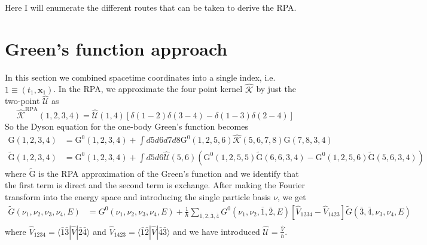 Here I will enumerate the different routes that can be taken to derive the RPA.
\section{Green's function approach}
In this section we combined spacetime coordinates into a single index, i.e. $1 \equiv (t_1, \mathbf{x}_1)$.
In the RPA, we approximate the four point kernel $\hat{\mathcal{K}}$ by just the two-point $\hat{\mathcal{U}}$ as
\begin{equation}
\hat{\mathcal{K}}^{\mathrm{RPA}}\left( 1, 2, 3, 4\right)=\hat{\mathcal{U}}\left(1, 4\right)\left[\delta\left(1-2\right) \delta\left(3-4\right)-\delta\left(1-3\right) \delta\left(2-4\right)\right]
\end{equation}
So the Dyson equation for the one-body Green's function becomes
\begin{align}
    \mathrm{G}\left(1, 2, 3, 4\right)&=\mathrm{G}^0\left(1, 2, 3, 4\right) + \int d5 d6 d7 d8 \mathrm{G}^0\left(1, 2, 5, 6\right) \hat{\mathcal{K}}\left(5, 6, 7, 8\right) \mathrm{G}\left(7, 8, 3, 4\right)\\
\tilde{\mathrm{G}}\left(1, 2, 3, 4\right) &=\mathrm{G}^0\left(1, 2, 3, 4\right)+ \int d5 d6 \hat{\mathcal{U}}\left(5, 6\right) \left( \mathrm{G}^0\left(1, 2, 5, 5\right) \tilde{\mathrm{G}}\left(6, 6, 3, 4\right) - \mathrm{G}^0\left(1, 2, 5, 6\right)  \tilde{\mathrm{G}}\left(5, 6, 3, 4\right)\right)
\end{align}
where $\tilde{\mathrm{G}}$ is the RPA approximation of the Green's function and we identify that the first term is direct and the second term is exchange. After making the Fourier transform into the energy space and introducing the single particle basis $\nu$, we get
\begin{align}
    \tilde{G}\left(\nu_1, \nu_2, \nu_3, \nu_4, E\right) &= G^0\left(\nu_1, \nu_2, \nu_3, \nu_4, E\right) + \frac{1}{\hbar} \sum_{\bar{1}, \bar{2}, \bar{3}, \bar{4}} G^0\left(\nu_1, \nu_2, \bar{1}, \bar{2}, E\right) \left[ \hat{V}_{1234} - \hat{V}_{1423} \right] \tilde{G}\left(\bar{3}, \bar{4}, \nu_3, \nu_4, E\right)\\
\end{align}
where  $\hat{V}_{1234} = \langle \bar{1} \bar{3} | \hat{V} | \bar{2} \bar{4} \rangle$ and $\hat{V}_{1423} = \langle \bar{1} \bar{2} | \hat{V} | \bar{4} \bar{3} \rangle$ and we have introduced $\hat{\mathcal{U}} = \frac{\hat{V}}{\hbar}$.
